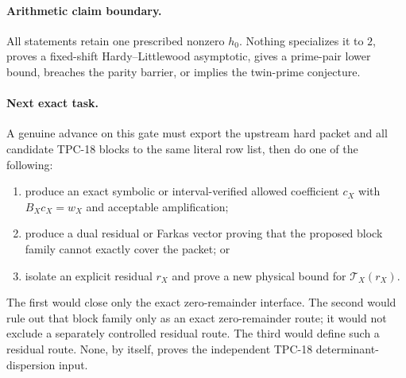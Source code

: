 \paragraph{Arithmetic claim boundary.}
All statements retain one prescribed nonzero \(h_0\).  Nothing
specializes it to \(2\), proves a fixed-shift Hardy--Littlewood
asymptotic, gives a prime-pair lower bound, breaches the parity
barrier, or implies the twin-prime conjecture.

\paragraph{Next exact task.}
A genuine advance on this gate must export the upstream hard packet
and all candidate TPC-18 blocks to the same literal row list, then do
one of the following:
\begin{enumerate}[label=(\alph*),leftmargin=2.2em]
\item produce an exact symbolic or interval-verified allowed
  coefficient \(c_X\) with \(B_Xc_X=w_X\) and acceptable
  amplification;
\item produce a dual residual or Farkas vector proving that the
  proposed block family cannot exactly cover the packet; or
\item isolate an explicit residual \(r_X\) and prove a new physical
  bound for \(\mathcal T_X(r_X)\).
\end{enumerate}
The first would close only the exact zero-remainder interface.  The
second would rule out that block family only as an exact
zero-remainder route; it would not exclude a separately controlled
residual route.  The third would define such a residual route.  None,
by itself, proves the independent TPC-18 determinant-dispersion input.
